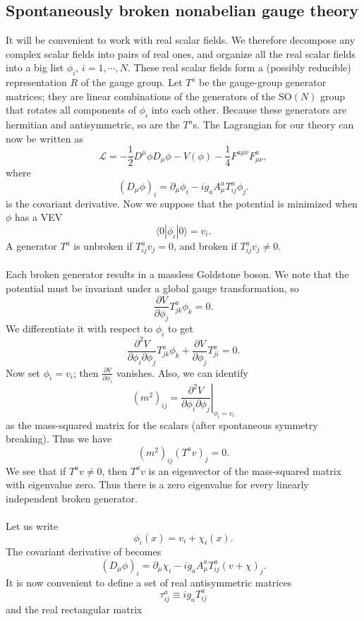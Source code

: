 \subsection{Spontaneously broken nonabelian gauge theory}
It will be convenient to work with real scalar fields. We
therefore decompose any complex scalar fields into pairs of real ones, and organize all the real scalar fields into a big list $\phi_i$, $i = 1,\cdots,N$. 
These real scalar fields form a (possibly reducible) representation $R$ of the gauge group. Let $T^a$ be the gauge-group generator matrices; they are linear combinations of the generators of the $\mathrm{SO}(N)$ group that rotates all components of $\phi_i$ into each other. Because these generators are hermitian and antisymmetric, so are the  $T^a$s. The Lagrangian for our theory can now be written as
\[\mathcal{L} = -\frac{1}{2}D^{\mu}\phi D_{\mu}\phi - V(\phi) - \frac{1}{4}F^{a\mu\nu}F^a_{\mu\nu},\]
where
\[(D_{\mu}\phi)_i = \partial_{\mu}\phi_i - ig_aA^a_{\mu}T^a_{ij}\phi_j.\]
is the covariant derivative.
Now we suppose that the potential is minimized when $\phi$ has a VEV
\[\langle 0 | \phi_i | 0 \rangle = v_i.\]
A generator $T^a$ is unbroken if $T^a_{ij}v_j = 0$, and broken if $T^a_{ij}v_j \neq 0$.
\\ \\
Each broken generator results in a massless Goldstone boson. We note that the potential must be invariant under a global gauge transformation, so
\[\frac{\partial V}{\partial \phi_j} T^a_{jk}\phi_k = 0.\]
We differentiate it with respect to $\phi_i$ to get
\[\frac{\partial^2 V}{\partial \phi_i \partial \phi_j} T^a_{jk}\phi_k + \frac{\partial V}{\partial \phi_j} T^a_{ji} = 0 .\]
Now set $\phi_i = v_i$; then $\frac{\partial V}{\partial \phi_i}$ vanishes. Also, we can identify
\[(m^2)_{ij} = \left. \frac{\partial^2 V}{\partial \phi_i \partial \phi_j} \right|_{\phi_i = v_i}\]
as the mass-squared matrix for the scalars (after spontaneous symmetry breaking). Thus we have
\[(m^2)_{ij} (T^av)_j = 0.\]
We see that if $T^av \neq 0$, then $T^av$ is an eigenvector of the mass-squared matrix with eigenvalue zero. Thus there is a zero eigenvalue for every linearly independent broken generator.
\\ \\
Let us write
\[\phi_i(x) = v_i + \chi_i(x).\]
The covariant derivative of becomes
\[(D_{\mu}\phi)_i = \partial_{\mu}\chi_i - ig_aA^a_{\mu}T^a_{ij}(v+\chi)_j.\]
It is now convenient to define a set of real antisymmetric matrices
\[\tau^a_{ij} \equiv ig_aT^a_{ij}\]
and the real rectangular matrix
